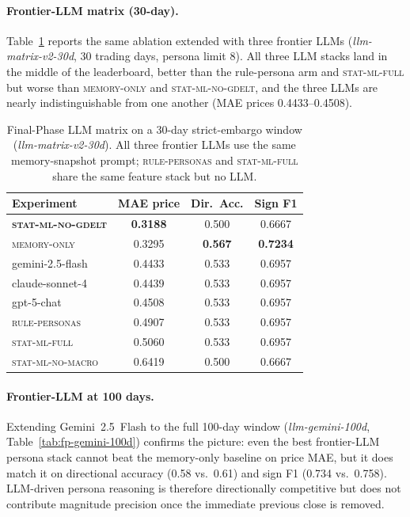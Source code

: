 \documentclass[11pt]{article}
\begin{document}
\paragraph{Frontier-LLM matrix (30-day).}
Table~\ref{tab:fp-llm-30d} reports the same ablation extended with three frontier LLMs (\textit{llm-matrix-v2-30d}, 30 trading days, persona limit 8). All three LLM stacks land in the middle of the leaderboard, better than the rule-persona arm and \textsc{stat-ml-full} but worse than \textsc{memory-only} and \textsc{stat-ml-no-gdelt}, and the three LLMs are nearly indistinguishable from one another (MAE prices 0.4433--0.4508).

\begin{table}[H]
\centering
\begingroup
\setlength{\tabcolsep}{3pt}
\captionsetup{justification=raggedright,singlelinecheck=false}
\small
\caption{Final-Phase LLM matrix on a 30-day strict-embargo window (\textit{llm-matrix-v2-30d}). All three frontier LLMs use the same memory-snapshot prompt; \textsc{rule-personas} and \textsc{stat-ml-full} share the same feature stack but no LLM.}
\label{tab:fp-llm-30d}
\begin{tabularx}{\columnwidth}{@{}>{\raggedright\arraybackslash}Xccc@{}}
\toprule
\textbf{Experiment} & \textbf{MAE price} & \textbf{Dir.\ Acc.} & \textbf{Sign F1} \\
\midrule
\textbf{\textsc{stat-ml-no-gdelt}} & \textbf{0.3188} & 0.500 & 0.6667 \\
\textsc{memory-only} & 0.3295 & \textbf{0.567} & \textbf{0.7234} \\
gemini-2.5-flash & 0.4433 & 0.533 & 0.6957 \\
claude-sonnet-4 & 0.4439 & 0.533 & 0.6957 \\
gpt-5-chat & 0.4508 & 0.533 & 0.6957 \\
\textsc{rule-personas} & 0.4907 & 0.533 & 0.6957 \\
\textsc{stat-ml-full} & 0.5060 & 0.533 & 0.6957 \\
\textsc{stat-ml-no-macro} & 0.6419 & 0.500 & 0.6667 \\
\bottomrule
\end{tabularx}
\endgroup
\end{table}

\paragraph{Frontier-LLM at 100 days.}
Extending Gemini~2.5~Flash to the full 100-day window (\textit{llm-gemini-100d}, Table~\ref{tab:fp-gemini-100d}) confirms the picture: even the best frontier-LLM persona stack cannot beat the memory-only baseline on price MAE, but it does match it on directional accuracy (0.58 vs.\ 0.61) and sign F1 (0.734 vs.\ 0.758). LLM-driven persona reasoning is therefore directionally competitive but does not contribute magnitude precision once the immediate previous close is removed.
\end{document}
